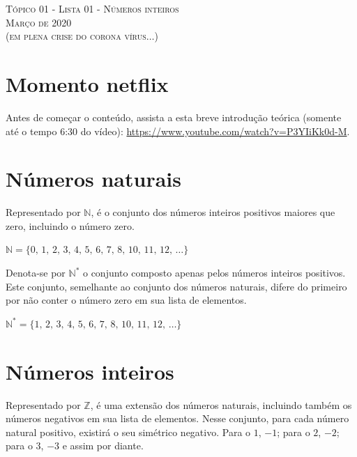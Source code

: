 \documentclass{exam}
\begin{document}
	\begin{center}
\large{\textsc{Tópico 01 - Lista 01 - Números inteiros\\
Março de 2020\\ (em plena crise do corona vírus$\ldots$)}}
	\end{center}

	
	\begin{multicols*}{2}
	\setlength{\columnseprule}{1pt}


\tableofcontents

\section{Momento netflix}

Antes de começar o conteúdo, assista a esta breve introdução teórica (somente até o tempo 6:30 do vídeo): \url{https://www.youtube.com/watch?v=P3YIiKk0d-M}.


\section{Números naturais}

Representado por $\mathbb{N}$, é o conjunto dos números inteiros positivos maiores que zero, incluindo o número zero.

\begin{center}
	$\mathbb{N} = \{0,\, 1,\, 2,\, 3,\, 4,\, 5,\, 6,\, 7,\, 8,\, 10,\, 11,\, 12,\, \ldots\}$
\end{center}

Denota-se por $\mathbb{N^*}$ o conjunto composto apenas pelos números inteiros positivos. Este conjunto, semelhante ao conjunto dos números naturais, difere do primeiro por não conter o número zero em sua lista de elementos.

\begin{center}
	$\mathbb{N^*} = \{1,\, 2,\, 3,\, 4,\, 5,\, 6,\, 7,\, 8,\, 10,\, 11,\, 12,\, \ldots\}$	
\end{center}


\section{Números inteiros}

Representado por $\mathbb{Z}$, é uma extensão dos números naturais, incluindo também os números negativos em sua lista de elementos. Nesse conjunto, para cada número natural positivo, existirá o seu simétrico negativo. Para o $1$, $-1$; para o $2$, $-2$; para o $3$, $-3$ e assim por diante.


\end{multicols*}
\end{document}
